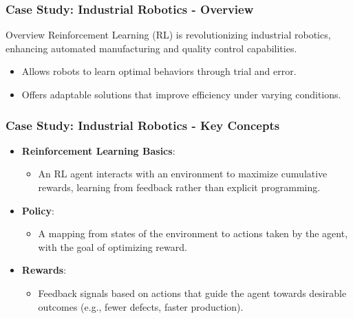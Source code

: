 \documentclass[aspectratio=169]{beamer}
\begin{document}
\begin{frame}[fragile]
    \frametitle{Case Study: Industrial Robotics - Overview}
    \begin{block}{Overview}
        Reinforcement Learning (RL) is revolutionizing industrial robotics, enhancing automated manufacturing and quality control capabilities. 
        \begin{itemize}
            \item Allows robots to learn optimal behaviors through trial and error.
            \item Offers adaptable solutions that improve efficiency under varying conditions.
        \end{itemize}
    \end{block}
\end{frame}

\begin{frame}[fragile]
    \frametitle{Case Study: Industrial Robotics - Key Concepts}
    \begin{itemize}
        \item \textbf{Reinforcement Learning Basics}:
        \begin{itemize}
            \item An RL agent interacts with an environment to maximize cumulative rewards, learning from feedback rather than explicit programming.
        \end{itemize}
        \item \textbf{Policy}:
        \begin{itemize}
            \item A mapping from states of the environment to actions taken by the agent, with the goal of optimizing reward.
        \end{itemize}
        \item \textbf{Rewards}:
        \begin{itemize}
            \item Feedback signals based on actions that guide the agent towards desirable outcomes (e.g., fewer defects, faster production).
        \end{itemize}
    \end{itemize}
\end{frame}
\end{document}
